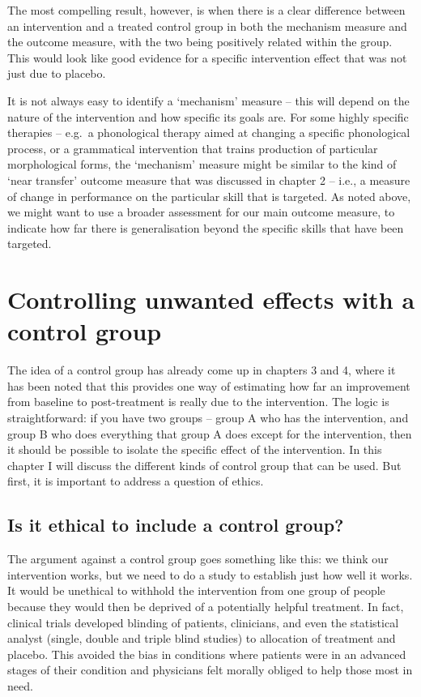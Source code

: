 \documentclass[]{book}
\begin{document}
The most compelling result, however, is when there is a clear difference between an intervention and a treated control group in both the mechanism measure and the outcome measure, with the two being positively related within the group. This would look like good evidence for a specific intervention effect that was not just due to placebo.

It is not always easy to identify a `mechanism' measure -- this will depend on the nature of the intervention and how specific its goals are. For some highly specific therapies -- e.g.~a phonological therapy aimed at changing a specific phonological process, or a grammatical intervention that trains production of particular morphological forms, the `mechanism' measure might be similar to the kind of `near transfer' outcome measure that was discussed in chapter 2 -- i.e., a measure of change in performance on the particular skill that is targeted. As noted above, we might want to use a broader assessment for our main outcome measure, to indicate how far there is generalisation beyond the specific skills that have been targeted.
 

\hypertarget{controlling-unwanted-effects-with-a-control-group}{%
\chapter{Controlling unwanted effects with a control group}\label{controlling-unwanted-effects-with-a-control-group}}

The idea of a control group has already come up in chapters 3 and 4, where it has been noted that this provides one way of estimating how far an improvement from baseline to post-treatment is really due to the intervention. The logic is straightforward: if you have two groups -- group A who has the intervention, and group B who does everything that group A does except for the intervention, then it should be possible to isolate the specific effect of the intervention. In this chapter I will discuss the different kinds of control group that can be used. But first, it is important to address a question of ethics.

\hypertarget{is-it-ethical-to-include-a-control-group}{%
\section{Is it ethical to include a control group?}\label{is-it-ethical-to-include-a-control-group}}

The argument against a control group goes something like this: we think our intervention works, but we need to do a study to establish just how well it works. It would be unethical to withhold the intervention from one group of people because they would then be deprived of a potentially helpful treatment. In fact, clinical trials developed blinding of patients, clinicians, and even the statistical analyst (single, double and triple blind studies) to allocation of treatment and placebo. This avoided the bias in conditions where patients were in an advanced stages of their condition and physicians felt morally obliged to help those most in need.
\end{document}
